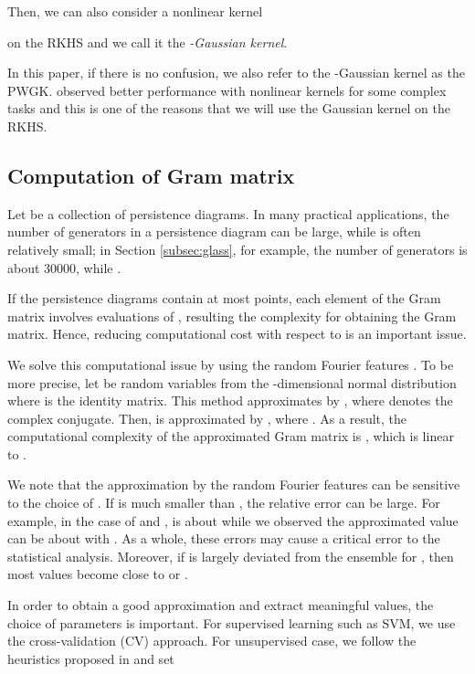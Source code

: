 \documentclass{article}
\begin{document}
Then, we can also consider a nonlinear kernel

on the RKHS and we call it the {\em -Gaussian kernel}.

In this paper, if there is no confusion, we also refer to the -Gaussian kernel as the PWGK.
\cite{MFDS12} observed better performance with nonlinear kernels for some complex tasks and this is one of the reasons that we will use the Gaussian kernel on the RKHS.


\subsection{Computation of Gram matrix}
\label{subsec:calculation}

Let  be a collection of persistence diagrams.
In many practical applications, the number of generators in a persistence diagram can be large, while  is often relatively small;
in Section \ref{subsec:glass}, for example, the number of generators is about 30000, while .

If the persistence diagrams contain at most  points, each element of the Gram matrix  involves  evaluations of , resulting the complexity  for obtaining the Gram matrix.
Hence, reducing computational cost with respect to  is an important issue.

We solve this computational issue by using the random Fourier features \cite{RR07}.
To be more precise, let  be random variables from the -dimensional normal distribution  where  is the identity matrix.  This method approximates  by , where  denotes the complex conjugate.
Then,   is approximated by , where .
As a result, the computational complexity of the approximated Gram matrix is , which is linear to .

We note that the approximation by the random Fourier features can be sensitive to the choice of .
If  is much smaller than , the relative error can be large.  
For example, in the case of  and ,  is about  while we observed the approximated value can be about  with .
As a whole, these  errors may cause a critical error to the statistical analysis.
Moreover, if  is largely deviated from the ensemble  for , then most values  become close to  or .

In order to obtain a good approximation and extract meaningful values, the choice of parameters is important.  For supervised learning such as SVM, we use the cross-validation (CV) approach.  For unsupervised case, we follow the heuristics proposed in \cite{GFTSSS07} and set 
\end{document}
